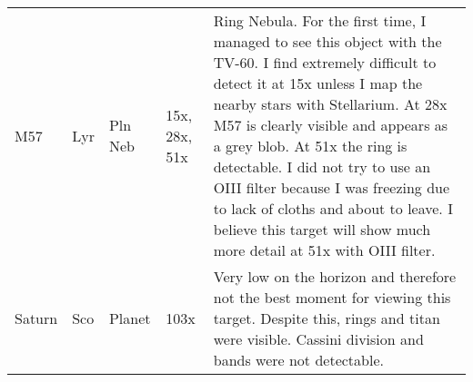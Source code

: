 \begin{longtable}{ p{0.8in}  p{0.3in}  p{0.5in}  p{0.9in}  p{5.8in} }
M57 & Lyr & Pln Neb & 15x, 28x, 51x & Ring Nebula. For the first time, I managed to see this object with the TV-60. I find extremely difficult to detect it at 15x unless I map the nearby stars with Stellarium. At 28x M57 is clearly visible and appears as a grey blob. At 51x the ring is detectable. I did not try to use an OIII filter because I was freezing due to lack of cloths and about to leave. I believe this target will show much more detail at 51x with OIII filter. \\ 
Saturn & Sco & Planet & 103x & Very low on the horizon and therefore not the best moment for viewing this target. Despite this, rings and titan were visible. Cassini division and bands were not detectable. \\ 
\hline 
\end{longtable} 
